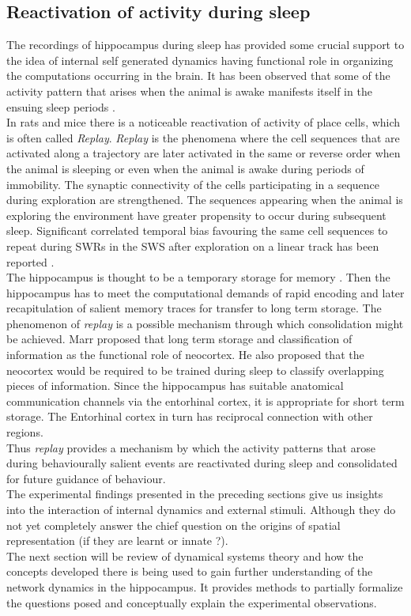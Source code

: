 \subsection{Reactivation of activity during sleep}
\label{replay}
The recordings of hippocampus during sleep has provided some crucial support to the idea of internal self generated dynamics having functional role in organizing the computations occurring in the brain. It has been observed that some of the activity pattern that arises when the animal is awake manifests itself in the ensuing sleep periods \cite{Wilson1994}. \\
In rats and mice there is a noticeable reactivation of activity of place cells, which is often called \emph{Replay}. \emph{Replay} is the phenomena where the cell sequences that are activated along a trajectory are later activated in the same or reverse order when the animal is sleeping or even when the animal is awake during periods of immobility. The synaptic connectivity of the cells participating in a sequence during exploration are strengthened.  The sequences appearing when the animal is exploring the environment have greater propensity to occur during subsequent sleep. Significant correlated temporal bias favouring the same cell sequences to repeat during SWRs in the SWS after exploration on a linear track has been reported \cite{Skaggs1996b}. \\
The hippocampus is thought to be a temporary storage for memory \cite{Buzsaki1989, Battaglia2011}. Then the hippocampus has to meet the computational demands of rapid encoding and later recapitulation of salient memory traces for transfer to long term storage. The phenomenon of \emph{replay} is a possible mechanism through which consolidation might be achieved.  Marr \cite{Marr2007} proposed that long term storage and classification of information as the functional role of neocortex. He also proposed that the neocortex would be required to be trained during sleep to classify overlapping pieces of information. Since the hippocampus has suitable anatomical communication channels via the entorhinal cortex, it is appropriate for short term storage. The Entorhinal cortex in turn has reciprocal connection with other regions. \\

Thus \emph{replay} provides a mechanism by which the activity patterns that arose during behaviourally salient events are reactivated during sleep and consolidated for future guidance of behaviour. \\


The experimental findings presented in the preceding sections give us insights into the interaction of internal dynamics and external stimuli. Although they do not yet completely answer the chief question on the origins of spatial representation (if they are learnt or innate ?). \\
The next section will be review of dynamical systems theory and how the concepts developed there is being used to gain further understanding of the network dynamics in the hippocampus. It provides methods to partially formalize the questions posed and conceptually explain the experimental observations. 






